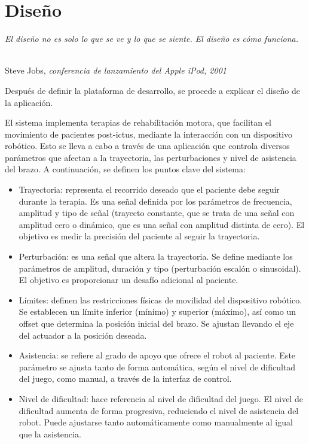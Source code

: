 \chapter{Diseño}
\label{cap:capitulo4}

\begin{flushright}
\begin{minipage}[]{9cm}
\emph{El diseño no es solo lo que se ve y lo que se siente. El diseño es cómo funciona.}\\
\end{minipage}\\

Steve Jobs, \textit{conferencia de lanzamiento del Apple iPod, 2001}\\
\end{flushright}

\vspace{1cm}

Después de definir la plataforma de desarrollo, se procede a explicar el diseño de la aplicación.

El sistema implementa terapias de rehabilitación motora, que facilitan el movimiento de pacientes post-ictus, mediante la interacción con un dispositivo robótico.
Esto se lleva a cabo a través de una aplicación que controla diversos parámetros que afectan a la trayectoria, las perturbaciones y nivel de asistencia del brazo.
A continuación, se definen los puntos clave del sistema:
\begin{itemize}
    \item Trayectoria: representa el recorrido deseado que el paciente debe seguir durante la terapia. Es una señal definida por los parámetros de frecuencia, amplitud y tipo de señal (trayecto constante, que se trata de una señal con amplitud cero o dinámico, que es una señal con amplitud distinta de cero). El objetivo es medir la precisión del paciente al seguir la trayectoria.
	\item Perturbación: es una señal que altera la trayectoria. Se define mediante los parámetros de amplitud, duración y tipo (perturbación escalón o sinusoidal). El objetivo es proporcionar un desafío adicional al paciente.
	\item Límites: definen las restricciones físicas de movilidad del dispositivo robótico. Se establecen un límite inferior (mínimo) y superior (máximo), así como un offset que determina la posición inicial del brazo. Se ajustan llevando el eje del actuador a la posición deseada.
	\item Asistencia: se refiere al grado de apoyo que ofrece el robot al paciente. Este parámetro se ajusta tanto de forma automática, según el nivel de dificultad del juego, como manual, a través de la interfaz de control.
	\item Nivel de dificultad: hace referencia al nivel de dificultad del juego. El nivel de dificultad aumenta de forma progresiva, reduciendo el nivel de asistencia del robot. Puede ajustarse tanto automáticamente como manualmente al igual que la asistencia.
\end{itemize}\


